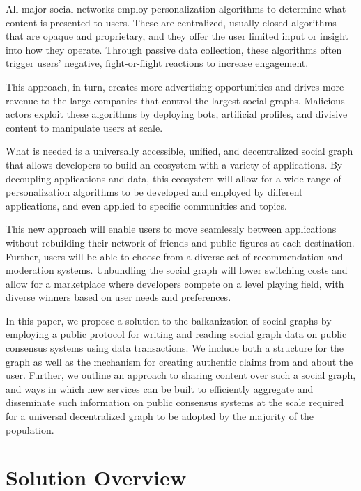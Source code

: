 \documentclass[12pt,letterpaper]{article}
\begin{document}
All major social networks employ personalization algorithms to determine what content is
presented to users. These are centralized, usually closed algorithms that are opaque and
proprietary, and they offer the user limited input or insight into how they operate.
Through passive data collection, these algorithms often trigger users' negative,
fight-or-flight reactions to increase engagement.\cite{psychology_today_2017}

This approach, in turn, creates more advertising opportunities and drives more revenue to
the large companies that control the largest social graphs. Malicious actors exploit these
algorithms by deploying bots, artificial profiles, and divisive content to manipulate users
at scale.

What is needed is a universally accessible, unified, and decentralized social graph that
allows developers to build an ecosystem with a variety of applications. By decoupling
applications and data, this ecosystem will allow for a wide range of personalization
algorithms to be developed and employed by different applications, and even applied to
specific communities and topics.

This new approach will enable users to move seamlessly between applications without
rebuilding their network of friends and public figures at each destination. Further, users
will be able to choose from a diverse set of recommendation and moderation systems.
Unbundling the social graph will lower switching costs and allow for a marketplace where
developers compete on a level playing field, with diverse winners based on user needs and
preferences.


In this paper, we propose a solution to the balkanization of social graphs by employing a
public protocol for writing and reading social graph data on public consensus systems using
data transactions. We include both a structure for the graph as well as the mechanism for
creating authentic claims from and about the user. Further, we outline an approach to
sharing content over such a social graph, and ways in which new services can be built to
efficiently aggregate and disseminate such information on public consensus systems at the
scale required for a universal decentralized graph to be adopted by the majority of the
population.

\section{Solution Overview}\label{sec:solution_overview}
\end{document}
